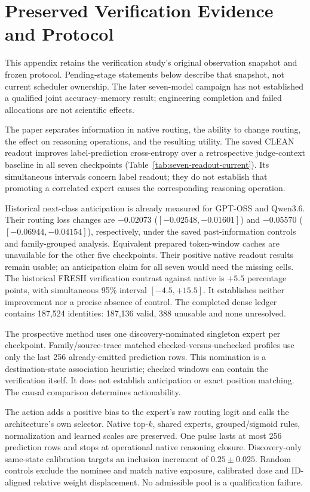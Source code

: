 \section{Preserved Verification Evidence and Protocol}
\label{sec:verification-study}

This appendix retains the verification study's original observation
snapshot and frozen protocol. Pending-stage statements below describe
that snapshot, not current scheduler ownership. The later seven-model
campaign has not established a qualified joint accuracy--memory result;
engineering completion and failed allocations are not scientific effects.

The paper separates information in native routing, the ability to change
routing, the effect on reasoning operations, and the resulting utility.
The saved CLEAN readout improves label-prediction cross-entropy over a
retrospective judge-context baseline in all seven checkpoints
(Table~\ref{tab:seven-readout-current}). Its simultaneous intervals concern
label readout; they do not establish that promoting a correlated expert
causes the corresponding reasoning operation.



Historical next-class anticipation is already measured for GPT-OSS and
Qwen3.6. Their routing loss changes are $-0.02073$
($[-0.02548,-0.01601]$) and $-0.05570$ ($[-0.06944,-0.04154]$), respectively,
under the saved past-information controls and family-grouped analysis.
Equivalent prepared token-window caches are unavailable for the other
five checkpoints. Their positive native readout results remain usable;
an anticipation claim for all seven would need the missing cells.
The historical FRESH verification contrast against native is
$+5.5$ percentage points, with simultaneous 95\% interval
$[-4.5,+15.5]$. It establishes neither improvement nor a precise absence
of control. The completed dense ledger contains 187,524 identities:
187,136 valid, 388 unusable and none unresolved.

The prospective method uses one discovery-nominated singleton expert per
checkpoint. Family/source-trace matched checked-versus-unchecked profiles
use only the last 256 already-emitted prediction rows. This nomination is
a destination-state association heuristic; checked windows can contain
the verification itself. It does not establish anticipation or exact
position matching. The causal comparison determines actionability.

The action adds a positive bias to the expert's raw routing logit and
calls the architecture's own selector. Native top-$k$, shared experts,
grouped/sigmoid rules, normalization and learned scales are preserved.
One pulse lasts at most 256 prediction rows and stops at operational
native reasoning closure. Discovery-only same-state calibration targets
an inclusion increment of $0.25\pm0.025$. Random controls exclude the
nominee and match native exposure, calibrated dose and ID-aligned relative
weight displacement. No admissible pool is a qualification failure.

